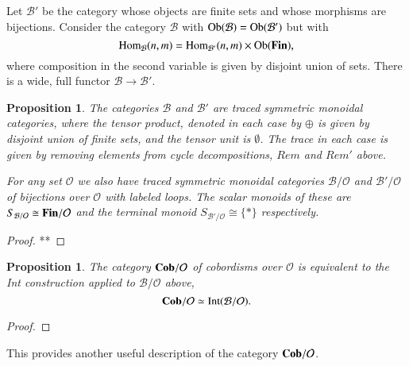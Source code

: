 \documentclass{amsart}
\def\tn{\textnormal}
\def\mc{\mathcal}
\def\Hom{\tn{Hom}}
\def\Ob{\tn{Ob}}
\def\singleton{{\{*\}}}
\def\to{\rightarrow}
\def\iso{\cong}
\def\Cob{{\bf Cob}}
\def\mcB{\mc{B}}
\def\mcO{\mc{O}}
\def\Fin{{\bf Fin}}
\def\Int{\tn{Int}}
\newtheorem{proposition}[subsection]{Proposition}
\theoremstyle{remark}
\theoremstyle{definition}
\begin{document}
Let $\mcB'$ be the category whose objects are finite sets and whose morphisms are bijections. Consider the category $\mcB$ with $\Ob(\mcB)=\Ob(\mcB')$ but with 
$$\Hom_{\mcB}(n,m)=\Hom_{\mcB'}(n,m)\times\Ob(\Fin),$$
where composition in the second variable is given by disjoint union of sets. There is a wide, full functor $\mcB\to\mcB'$.

\begin{proposition}

The categories $\mcB$ and $\mcB'$ are traced symmetric monoidal categories, where the tensor product, denoted in each case by $\oplus$ is given by disjoint union of finite sets, and the tensor unit is $\emptyset$. The trace in each case is given by removing elements from cycle decompositions, $Rem$ and $Rem'$ above.

For any set $\mcO$ we also have traced symmetric monoidal categories $\mcB/\mcO$ and $\mcB'/\mcO$ of bijections over $\mcO$ with labeled loops. The scalar monoids of these are $S_{\mcB/\mcO}\iso\Fin/\mcO$ and the terminal monoid $S_{\mcB'/\mcO}\iso\singleton$ respectively. 

\end{proposition}

\begin{proof}

**

\end{proof}

\begin{proposition}

The category $\Cob/\mcO$ of cobordisms over $\mcO$ is equivalent to the Int construction applied to $\mcB/\mcO$ above,
$$\Cob/\mcO\simeq\Int(\mcB/\mcO).$$

\end{proposition}

\begin{proof}



\end{proof}

This provides another useful description of the category $\Cob/\mcO$.
\end{document}

